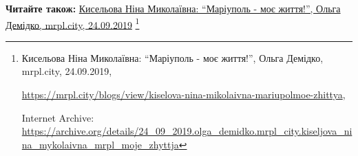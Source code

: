  
 
 
 
 

\def\pubIA{https://archive.org/details/24_09_2019.olga_demidko.mrpl_city.kiseljova_nina_mykolaivna_mrpl_moje_zhyttja}
\def\pubTitle{Кисельова Ніна Миколаївна: \enquote{Маріуполь - моє життя!}}
\def\pubDate{24.09.2019}
\def\pubOrigin{https://mrpl.city/blogs/view/kiselova-nina-mikolaivna-mariupolmoe-zhittya}
\def\pubAuthor{Ольга Демідко}

\textbf{Читайте також:} \href{\pubIA}{%
\pubTitle, \pubAuthor, mrpl.city, \pubDate}%
\footnote{\pubTitle, \pubAuthor, mrpl.city, \pubDate, \par\url{\pubOrigin}, \par Internet Archive: \url{\pubIA}}
